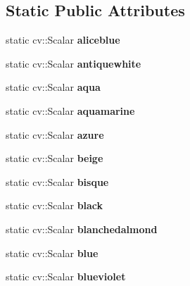 \subsection*{Static Public Attributes}
\begin{DoxyCompactItemize}
\item 
\mbox{\label{classColor_a88a5bf171ce168ab379b58dbd92814ba}} 
static cv\+::\+Scalar {\bfseries aliceblue}
\item 
\mbox{\label{classColor_a735ee9f924c2af20c5522ca8828c9533}} 
static cv\+::\+Scalar {\bfseries antiquewhite}
\item 
\mbox{\label{classColor_a37a9aac4588382540584c16410301122}} 
static cv\+::\+Scalar {\bfseries aqua}
\item 
\mbox{\label{classColor_aecb9e4fa05ad18f4084b2ebc92d0a9e3}} 
static cv\+::\+Scalar {\bfseries aquamarine}
\item 
\mbox{\label{classColor_a4895967cde4c3d335605a9c8b21f751f}} 
static cv\+::\+Scalar {\bfseries azure}
\item 
\mbox{\label{classColor_adeb3d6376704ba21460fa983b58518af}} 
static cv\+::\+Scalar {\bfseries beige}
\item 
\mbox{\label{classColor_a7e65f26addfdb64316195e28bd368469}} 
static cv\+::\+Scalar {\bfseries bisque}
\item 
\mbox{\label{classColor_ab56ddc73fe2d1fc425adceb1acca7838}} 
static cv\+::\+Scalar {\bfseries black}
\item 
\mbox{\label{classColor_a63344c3fe932123c37d5ae4d97034fb4}} 
static cv\+::\+Scalar {\bfseries blanchedalmond}
\item 
\mbox{\label{classColor_a614f8bc0da6ecd5acedecdcea46f8e1e}} 
static cv\+::\+Scalar {\bfseries blue}
\item 
\mbox{\label{classColor_aa35397c715f5801c25545326950d9435}} 
static cv\+::\+Scalar {\bfseries blueviolet}
\item 

\end{DoxyCompactItemize}
